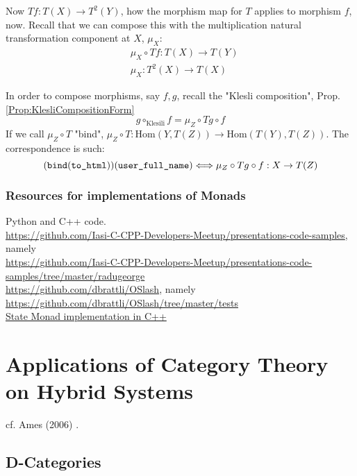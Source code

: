 \documentclass[10pt]{amsart}
\begin{document}
\begin{multicols*}{2}
Now $Tf:T(X) \to T^2(Y)$, how the morphism map for $T$ applies to morphism $f$, now. Recall that we can compose this with the multiplication natural transformation component at $X$, $\mu_X$:
\[
\begin{aligned}
& \mu_X \circ Tf : T(X) \to T(Y) \\ 
& \mu_X : T^2(X) \to T(X)
\end{aligned}
\]

In order to compose morphisms, say $f,g$, recall the "Klesli composition", Prop. \ref{Prop:KlesliCompositionForm}
\begin{equation}
g\circ_{\text{Klesili}} f = \mu_Z \circ Tg \circ f
\end{equation}
If we call $\mu_Z \circ T$ "bind", $\mu_Z \circ T: \text{Hom}(Y, T(Z)) \to \text{Hom}(T(Y), T(Z))$. The correspondence is such:
\begin{equation}
(\texttt{bind}(\verb|to_html|))(\verb|user_full_name|) \Longleftrightarrow \mu_Z \circ Tg \circ f: X \to T(Z)
\end{equation}


\subsubsection{Resources for implementations of Monads} Python and C++ code. \\

\url{https://github.com/Iasi-C-CPP-Developers-Meetup/presentations-code-samples}, namely \\
\url{https://github.com/Iasi-C-CPP-Developers-Meetup/presentations-code-samples/tree/master/radugeorge} \\

\url{https://github.com/dbrattli/OSlash}, namely \\
\url{https://github.com/dbrattli/OSlash/tree/master/tests} \\

\href{https://gist.github.com/pfultz2/f538423ebc9bbbe3df92}{State Monad implementation in C++}


\section{Applications of Category Theory on Hybrid Systems}

cf. Ames (2006) \cite{Ames2006}.
	
\subsection{D-Categories}


\end{multicols*}
\end{document}
